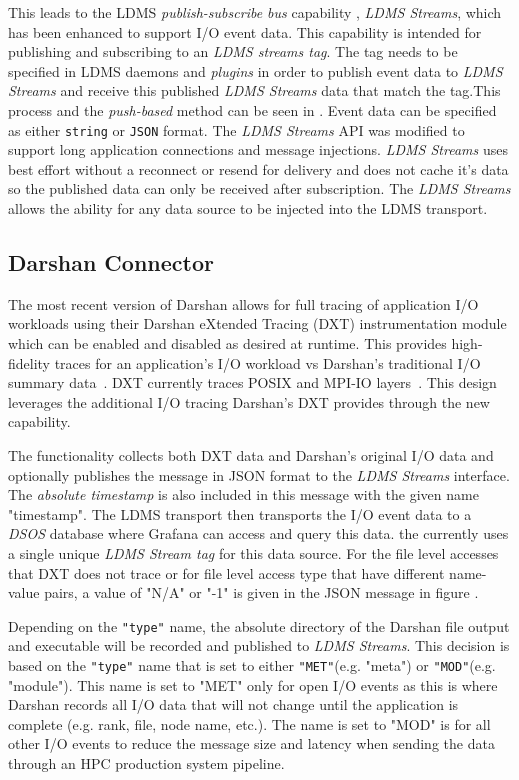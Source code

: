 \documentclass[conference]{IEEEtran}
\begin{document}
This leads to the LDMS \emph{publish-subscribe bus} capability , \emph{LDMS Streams}, which has been enhanced to support I/O event data. This capability is intended for publishing and subscribing to an \emph{LDMS streams tag}. The tag needs to be specified in LDMS daemons and \emph{plugins} in order to publish event data to \emph{LDMS Streams} and receive this published \emph{LDMS Streams} data that match the tag.This process and the \emph{push-based} method can be seen in . Event data can be specified as either \texttt{string} or \texttt{JSON} format. The \emph{LDMS Streams} API was modified to support long application connections and message injections. \emph{LDMS Streams} uses best effort without a reconnect or resend for delivery and does not cache it's data so the published data can only be received after subscription. The \emph{LDMS Streams} allows the ability for any data source to be injected into the LDMS transport.

\subsection{Darshan Connector}

The most recent version of Darshan allows for full tracing of application I/O workloads using their Darshan eXtended Tracing (DXT) instrumentation module which can be enabled and disabled as desired at runtime. This provides high-fidelity traces for an application's I/O workload vs Darshan's traditional I/O summary data~\cite{darshan-runtime}. DXT currently traces POSIX and MPI-IO layers~\cite{darshan-runtime}. This design leverages the additional I/O tracing Darshan's DXT provides through the new \connector capability.


The \connector functionality collects both DXT data and Darshan's original I/O data and optionally publishes the message in JSON format to the \emph{LDMS Streams} interface. The \emph{absolute timestamp} is also included in this message with the given name "timestamp". The LDMS transport then transports the I/O event data to a \emph{DSOS} database where Grafana can access and query this data. the \connector currently uses a single unique \emph{LDMS Stream tag} for this data source. For the file level accesses that DXT does not trace or for file level access type that have different name-value pairs, a value of "N/A" or "-1" is given in the JSON message in figure . 

Depending on the \texttt{"type"} name, the absolute directory of the Darshan file output and executable will be recorded and published to \emph{LDMS Streams}. This decision is based on the \texttt{"type"} name that is set to either \texttt{"MET"}(e.g. "meta") or \texttt{"MOD"}(e.g. "module"). This name is set to "MET" only for open I/O events as this is where Darshan records all I/O data that will not change until the application is complete (e.g. rank, file, node name, etc.). The name is set to "MOD" is for all other I/O events to reduce the message size and latency when sending the data through an HPC production system pipeline.
\end{document}
